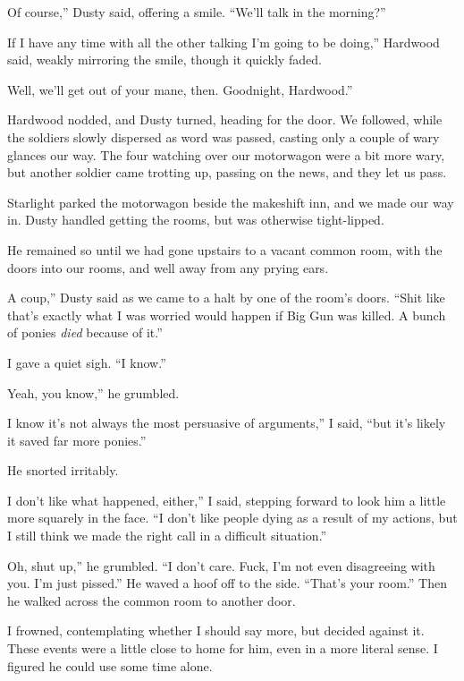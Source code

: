 \leavevmode{}Of course,” Dusty said, offering a smile. “We’ll talk in the morning?”

\leavevmode{}If I have any time with all the other talking I’m going to be doing,” Hardwood said, weakly mirroring the smile, though it quickly faded.

\leavevmode{}Well, we’ll get out of your mane, then. Goodnight, Hardwood.”

Hardwood nodded, and Dusty turned, heading for the door. We followed, while the soldiers slowly dispersed as word was passed, casting only a couple of wary glances our way. The four watching over our motorwagon were a bit more wary, but another soldier came trotting up, passing on the news, and they let us pass.

Starlight parked the motorwagon beside the makeshift inn, and we made our way in. Dusty handled getting the rooms, but was otherwise tight-lipped.

He remained so until we had gone upstairs to a vacant common room, with the doors into our rooms, and well away from any prying ears.

\leavevmode{}A coup,” Dusty said as we came to a halt by one of the room's doors. “Shit like that’s exactly what I was worried would happen if Big Gun was killed. A bunch of ponies \textit{died} because of it.”

I gave a quiet sigh. “I know.”

\leavevmode{}Yeah, you know,” he grumbled.

\leavevmode{}I know it’s not always the most persuasive of arguments,” I said, “but it’s likely it saved far more ponies.”

He snorted irritably.

\leavevmode{}I don’t like what happened, either,” I said, stepping forward to look him a little more squarely in the face. “I don’t like people dying as a result of my actions, but I still think we made the right call in a difficult situation.”

\leavevmode{}Oh, shut up,” he grumbled. “I don’t care. Fuck, I’m not even disagreeing with you. I’m just pissed.” He waved a hoof off to the side. “That’s your room.” Then he walked across the common room to another door.

I frowned, contemplating whether I should say more, but decided against it. These events were a little close to home for him, even in a more literal sense. I figured he could use some time alone.

